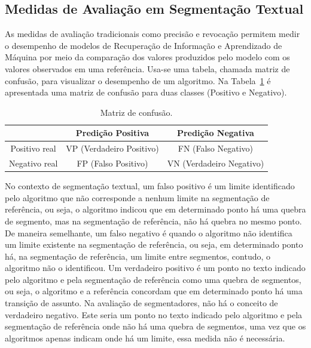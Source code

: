 \subsection{Medidas de Avaliação em Segmentação Textual}
\label{subsec:medidas-segmentacao}

% 


As medidas de avaliação tradicionais como precisão e revocação permitem medir o desempenho de modelos de Recuperação de Informação e Aprendizado de Máquina por meio da comparação dos valores produzidos pelo modelo com os valores observados em uma referência. 
Usa-se uma tabela, chamada matriz de confusão, para visualizar o desempenho de um algoritmo. Na Tabela~\ref{tab:matrizconfusao} é apresentada uma matriz de confusão para duas classes (Positivo e Negativo). 


\begin{table}[!h]
\centering

\begin{tabular}{|c|c|c|}
  \hline
				& Predição Positiva        & Predição Negativa        \\ \hline
  Positivo real & VP (Verdadeiro Positivo) & FN (Falso Negativo)      \\ \hline
  Negativo real & FP (Falso Positivo)      & VN (Verdadeiro Negativo) \\ \hline

\end{tabular}

\caption{Matriz de confusão.}
\label{tab:matrizconfusao}

\end{table}



No contexto de segmentação textual, um falso positivo é um limite identificado pelo algoritmo que não corresponde a nenhum limite na segmentação de referência, ou seja, o algoritmo indicou que em determinado ponto há uma quebra de segmento, mas na segmentação de referência, não há quebra no mesmo ponto. De maneira semelhante, um falso negativo é quando o algoritmo não identifica um limite existente na segmentação de referência, ou seja, em determinado ponto há, na segmentação de referência, um limite entre segmentos, contudo, o algoritmo não o identificou.  Um verdadeiro positivo é um ponto no texto indicado pelo algoritmo e pela segmentação de referência como uma quebra de segmentos, ou seja, o algoritmo e a referência concordam que em determinado ponto há uma transição de assunto.  Na avaliação de segmentadores, não há o conceito de verdadeiro negativo. Este seria um ponto no texto indicado pelo algoritmo e pela segmentação de referência onde não há uma quebra de segmentos, uma vez que os algoritmos apenas indicam onde há um limite, essa medida não é necessária. %


